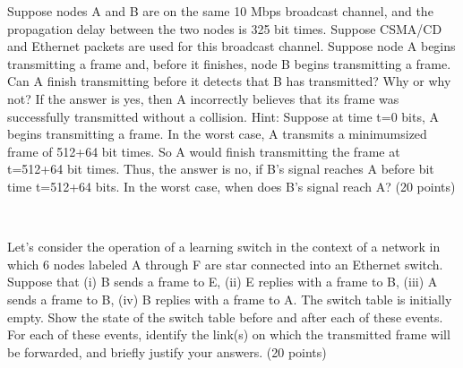 \begin{exercise}[]{ Suppose nodes A and B are on the same 10 Mbps broadcast channel, and the
    propagation delay between the two nodes is 325 bit times. Suppose CSMA/CD and Ethernet
    packets are used for this broadcast channel. Suppose node A begins transmitting a frame
    and, before it finishes, node B begins transmitting a frame. Can A finish transmitting before
    it detects that B has transmitted? Why or why not? If the answer is yes, then A incorrectly
    believes that its frame was successfully transmitted without a collision. Hint: Suppose at
    time t=0 bits, A begins transmitting a frame. In the worst case, A transmits a minimumsized frame of 512+64 bit times. So A would finish transmitting the frame at t=512+64 bit
    times. Thus, the answer is no, if B’s signal reaches A before bit time t=512+64 bits. In the
    worst case, when does B’s signal reach A? (20 points)}
  \begin{solution}
  \par{~}
  \end{solution}
  \label{ex5}
\end{exercise}



\begin{exercise}[]{Let’s consider the operation of a learning switch in the context of a network
    in which 6 nodes labeled A through F are star connected into an Ethernet switch. Suppose
    that (i) B sends a frame to E, (ii) E replies with a frame to B, (iii) A sends a frame to B, (iv)
    B replies with a frame to A. The switch table is initially empty. Show the state of the switch
    table before and after each of these events. For each of these events, identify the link(s) on
    which the transmitted frame will be forwarded, and briefly justify your answers. (20 points)}
  \begin{solution}
  \par{~}
  \end{solution}
  \label{ex6}
\end{exercise}